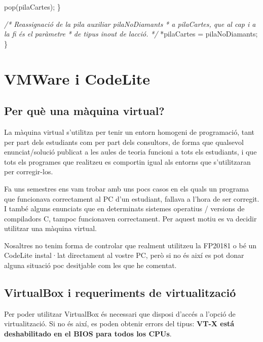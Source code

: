 \documentclass[
]{book}
\newenvironment{Shaded}{\begin{snugshade}}{\end{snugshade}}
\newcommand{\CommentTok}[1]{\textcolor[rgb]{0.56,0.35,0.01}{\textit{#1}}}
\newcommand{\NormalTok}[1]{#1}
\begin{document}
\begin{Shaded}
\begin{Highlighting}[]
\NormalTok{        pop(pilaCartes);}
\NormalTok{    \}}
    
    \CommentTok{/* Reassignació de la pila auxiliar pilaNoDiamants}
\CommentTok{     * a pilaCartes, que al cap i a la fi és el paràmetre}
\CommentTok{     * de tipus inout de l\textquotesingle{}acció. }
\CommentTok{     */}
\NormalTok{    *pilaCartes = pilaNoDiamants;}
\NormalTok{\}}
\end{Highlighting}
\end{Shaded}

\hypertarget{vmware-i-codelite}{%
\chapter{VMWare i CodeLite}\label{vmware-i-codelite}}

\hypertarget{per-quuxe8-una-muxe0quina-virtual}{%
\section{Per què una màquina virtual?}\label{per-quuxe8-una-muxe0quina-virtual}}

La màquina virtual s'utilitza per tenir un entorn homogeni de programació, tant per part dels estudiants com per part dels consultors, de forma que qualsevol enunciat/solució publicat a les aules de teoria funcioni a tots els estudiants, i que tots els programes que realitzeu es comportin igual als entorns que s'utilitzaran per corregir-los.

Fa uns semestres ens vam trobar amb uns pocs casos en els quals un programa que funcionava correctament al PC d'un estudiant, fallava a l'hora de ser corregit. I també alguns enunciats que en determinats sistemes operatius / versions de compiladors C, tampoc funcionaven correctament. Per aquest motiu es va decidir utilitzar una màquina virtual.

Nosaltres no tenim forma de controlar que realment utilitzeu la FP20181 o bé un CodeLite instal·lat directament al vostre PC, però si no és així es pot donar alguna situació poc desitjable com les que he comentat.

\hypertarget{virtualbox-i-requeriments-de-virtualitzaciuxf3}{%
\section{VirtualBox i requeriments de virtualització}\label{virtualbox-i-requeriments-de-virtualitzaciuxf3}}

Per poder utilitzar VirtualBox és necessari que disposi d'accés a l'opció de virtualització. Si no és així, es poden obtenir errors del tipus: \textbf{VT-X está deshabilitado en el BIOS para todos los CPUs}.
\end{document}
